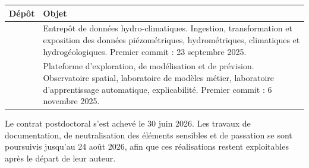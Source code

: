 \begin{center}
\begin{tabularx}{\textwidth}{@{}lX@{}}
\toprule
\textbf{Dépôt} & \textbf{Objet} \\
\midrule
\hubeau{}~\cite{depot_entrepot} & Entrepôt de données hydro-climatiques. Ingestion, transformation et exposition
des données piézométriques, hydrométriques, climatiques et hydrogéologiques. Premier commit :
23 septembre 2025. \\
\junon{}~\cite{depot_plateforme} & Plateforme d'exploration, de modélisation et de prévision. Observatoire spatial,
laboratoire de modèles métier, laboratoire d'apprentissage automatique, explicabilité. Premier
commit : 6 novembre 2025. \\
\bottomrule
\end{tabularx}
\end{center}

Le contrat postdoctoral s'est achevé le 30 juin 2026. Les travaux de documentation, de
neutralisation des éléments sensibles et de passation se sont poursuivis jusqu'au 24 août 2026,
afin que ces réalisations restent exploitables après le départ de leur auteur.

